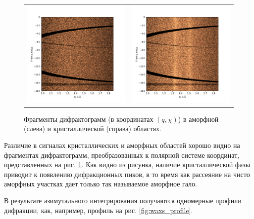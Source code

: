 	\begin{figure}[t]\center
\begin{tabular}{cc}
\includegraphics[width=0.5\linewidth]{fig/azim-amo.pdf}
&
\includegraphics[width=0.5\linewidth]{fig/azim-cryst.pdf}
\end{tabular}
\caption{Фрагменты дифрактограмм (в координатах $(q,\chi)$) в аморфной (слева) и кристаллической (справа) областях.}
\label{fig:azim}
\end{figure}

	

	
	Различие в сигналах кристаллических и аморфных областей хорошо видно на фрагментах дифрактограмм, преобразованных к полярной системе координат, представленных на рис. \ref{fig:azim}. 
	Как видно из рисунка, наличие кристаллической фазы приводит к появлению  дифракционных пиков, в то время как рассеяние на чисто аморфных участках дает только так называемое аморфное гало.
	
В результате азимутального интегрирования получаются одномерные профили дифракции, как, например, профиль на рис.  \ref{fig:waxs_profile}.


